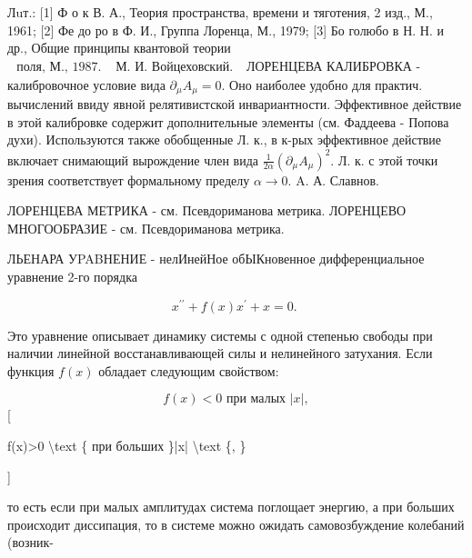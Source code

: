 \documentclass[10pt]{article}
\begin{document}
Лuт.: [1] Ф о к В. А., Теория пространства, времени и тяготения, 2 изд., М., 1961; [2] Фе до ро в Ф. И., Группа Лоренца, М., 1979; [3] Бо голюбо в Н. Н. и др., Общие принципы квантовой теории $\begin{array}{ll}\text { поля, М., } 1987 . & \text { М. И. Войцеховский. }\end{array}$ ЛОРЕНЦЕВА КАЛИБРОВКА - калибровочное условие вида $\partial_{\mu} A_{\mu}=0$. Оно наиболее удобно для практич. вычислений ввиду явной релятивистской инвариантности. Эффективное действие в этой калибровке содержит дополнительные элементы (см. Фаддеева - Попова духи). Используются также обобщенные Л. к., в к-рых эффективное действие включает снимающий вырождение член вида $\frac{1}{2 \alpha}\left(\partial_{\mu} A_{\mu}\right)^{2}$. Л. к. с этой точки зрения соответствует формальному пределу $\alpha \rightarrow 0$. A. А. Славнов.



ЛОРЕНЦЕВА МЕТРИКА - см. Псевдориманова метрика. ЛОРЕНЦЕВО МНОГООБРАЗИЕ - см. Псевдориманова метрика.



ЛЬЕНАРА УPABНЕНИЕ - нелИнейНое обЫКновенное дифференциальное уравнение 2-го порядка



\[

x^{\prime \prime}+f(x) x^{\prime}+x=0 \text {. }

\]



Это уравнение описывает динамику системы с одной степенью свободы при наличии линейной восстанавливающей силы и нелинейного затухания. Если функция $f(x)$ обладает следующим свойством:



\[

f(x)<0 \text { при малых }|x|,

\][



f(x)>0 \textbackslash text \{ при больших \}|x| \textbackslash text \{, \}

]



то есть если при малых амплитудах система поглощает энергию, а при больших происходит диссипация, то в системе можно ожидать самовозбуждение колебаний (возник-
\end{document}
